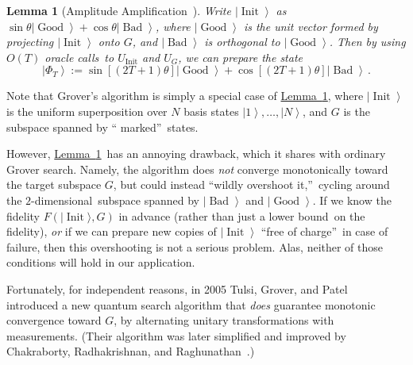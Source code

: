 \documentclass[10pt]{article}
\newtheorem{lemma}[theorem]{Lemma}
\theoremstyle{definition}
\numberwithin{equation}{section}
\newcommand{\expref}[2]{\texorpdfstring{\hyperref[#2]{#1~\ref{#2}}}{#1~\ref{#2}}}
\begin{document}
\begin{lemma}
[Amplitude Amplification~\cite{bhmt}]\label{aa}Write $\left\vert
\operatorname*{Init}\right\rangle $ as $\sin\theta\left\vert
\operatorname*{Good}\right\rangle +\cos\theta\left\vert \operatorname*{Bad}%
\right\rangle $, where $\left\vert \operatorname*{Good}\right\rangle $ is the
unit vector formed by projecting $\left\vert \operatorname*{Init}\right\rangle
$ onto $G$, and $\left\vert \operatorname*{Bad}\right\rangle $ is orthogonal
to $\left\vert \operatorname*{Good}\right\rangle $. Then by using $O\left(
T\right)  $ oracle calls\ to $U_{\operatorname*{Init}}$ and $U_{G}$, we can
prepare the state%
\[
\left\vert \Phi_{T}\right\rangle :=\sin\left[  \left(  2T+1\right)
\theta\right]  \left\vert \operatorname*{Good}\right\rangle +\cos\left[
\left(  2T+1\right)  \theta\right]  \left\vert \operatorname*{Bad}%
\right\rangle\,.
\]

\end{lemma}

Note that Grover's algorithm is simply a special case of \expref{Lemma}{aa}, where
$\left\vert \operatorname*{Init}\right\rangle $ is the uniform superposition
over $N$ basis states $\left\vert 1\right\rangle ,\ldots,\left\vert
N\right\rangle $, and $G$ is the subspace spanned by \textquotedblleft
marked\textquotedblright\ states.

However, \expref{Lemma}{aa}\ has an annoying drawback, which it shares with
ordinary Grover search. Namely, the algorithm does \emph{not} converge
monotonically toward the target subspace $G$, but could instead
\textquotedblleft wildly overshoot it,\textquotedblright\ cycling around the
$2$-dimensional\ subspace spanned by $\left\vert \operatorname*{Bad}%
\right\rangle $ and $\left\vert \operatorname*{Good}\right\rangle $. If we
know the fidelity $F(\vert \operatorname*{Init}\rangle
,G)$ in advance (rather than just a lower bound\ on the fidelity),
\emph{or} if we can prepare new copies of $\left\vert \operatorname*{Init}%
\right\rangle $ \textquotedblleft free of charge\textquotedblright\ in case of
failure, then this overshooting is not a serious problem. Alas, neither of
those conditions will hold in our application.

Fortunately, for independent reasons, in 2005 Tulsi, Grover, and Patel~\cite{tgp} introduced a new quantum search algorithm that \emph{does}
guarantee monotonic convergence toward $G$, by alternating unitary
transformations with measurements. (Their algorithm was later simplified and
improved by Chakraborty, Radhakrishnan, and Raghunathan~\cite{crr}.)
\end{document}
